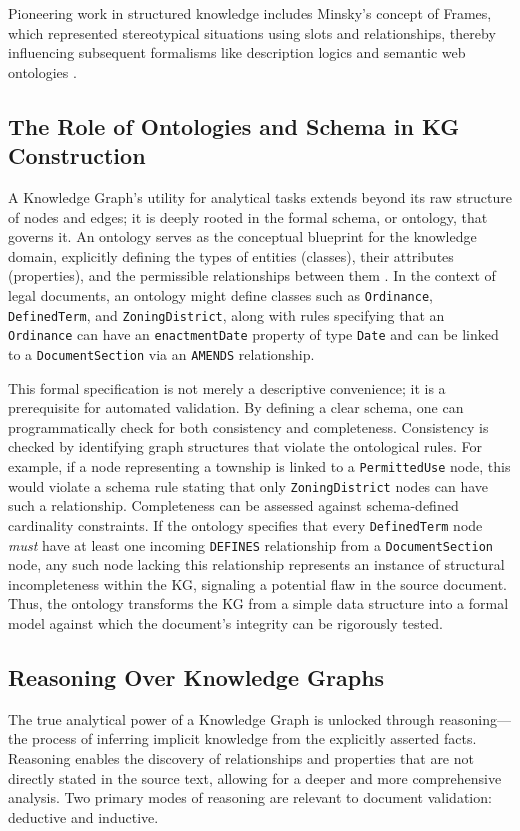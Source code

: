 Pioneering work in structured knowledge includes Minsky's concept of Frames, which represented stereotypical situations using slots and relationships, thereby influencing subsequent formalisms like description logics and semantic web ontologies \parencite{RefWorks:RefID:78-minsky1974framework}.

\subsection{The Role of Ontologies and Schema in KG Construction}
\label{subsec:ontologies}
A Knowledge Graph's utility for analytical tasks extends beyond its raw structure of nodes and edges; it is deeply rooted in the formal schema, or ontology, that governs it. An ontology serves as the conceptual blueprint for the knowledge domain, explicitly defining the types of entities (classes), their attributes (properties), and the permissible relationships between them \parencite{RefWorks:RefID:135-noy2001ontology}. In the context of legal documents, an ontology might define classes such as \texttt{Ordinance}, \texttt{DefinedTerm}, and \texttt{ZoningDistrict}, along with rules specifying that an \texttt{Ordinance} can have an \texttt{enactmentDate} property of type \texttt{Date} and can be linked to a \texttt{DocumentSection} via an \texttt{AMENDS} relationship.

This formal specification is not merely a descriptive convenience; it is a prerequisite for automated validation. By defining a clear schema, one can programmatically check for both consistency and completeness. Consistency is checked by identifying graph structures that violate the ontological rules. For example, if a node representing a township is linked to a \texttt{PermittedUse} node, this would violate a schema rule stating that only \texttt{ZoningDistrict} nodes can have such a relationship. Completeness can be assessed against schema-defined cardinality constraints. If the ontology specifies that every \texttt{DefinedTerm} node \textit{must} have at least one incoming \texttt{DEFINES} relationship from a \texttt{DocumentSection} node, any such node lacking this relationship represents an instance of structural incompleteness within the KG, signaling a potential flaw in the source document. Thus, the ontology transforms the KG from a simple data structure into a formal model against which the document's integrity can be rigorously tested.

\subsection{Reasoning Over Knowledge Graphs}
\label{subsec:kg_reasoning}
The true analytical power of a Knowledge Graph is unlocked through reasoning—the process of inferring implicit knowledge from the explicitly asserted facts. Reasoning enables the discovery of relationships and properties that are not directly stated in the source text, allowing for a deeper and more comprehensive analysis. Two primary modes of reasoning are relevant to document validation: deductive and inductive.


